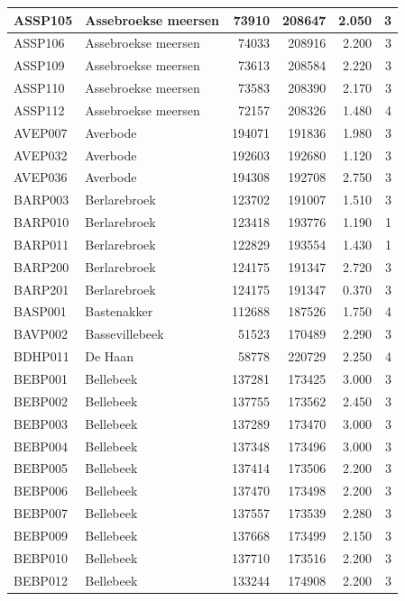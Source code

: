 \documentclass[11pt,]{book}
\begin{document}
\begin{table}
\begin{tabular}[t]{l|l|r|r|r|r}
\hline
ASSP105 & Assebroekse meersen & 73910 & 208647 & 2.050 & 3\\
\hline
ASSP106 & Assebroekse meersen & 74033 & 208916 & 2.200 & 3\\
\hline
ASSP109 & Assebroekse meersen & 73613 & 208584 & 2.220 & 3\\
\hline
ASSP110 & Assebroekse meersen & 73583 & 208390 & 2.170 & 3\\
\hline
ASSP112 & Assebroekse meersen & 72157 & 208326 & 1.480 & 4\\
\hline
AVEP007 & Averbode & 194071 & 191836 & 1.980 & 3\\
\hline
AVEP032 & Averbode & 192603 & 192680 & 1.120 & 3\\
\hline
AVEP036 & Averbode & 194308 & 192708 & 2.750 & 3\\
\hline
BARP003 & Berlarebroek & 123702 & 191007 & 1.510 & 3\\
\hline
BARP010 & Berlarebroek & 123418 & 193776 & 1.190 & 1\\
\hline
BARP011 & Berlarebroek & 122829 & 193554 & 1.430 & 1\\
\hline
BARP200 & Berlarebroek & 124175 & 191347 & 2.720 & 3\\
\hline
BARP201 & Berlarebroek & 124175 & 191347 & 0.370 & 3\\
\hline
BASP001 & Bastenakker & 112688 & 187526 & 1.750 & 4\\
\hline
BAVP002 & Bassevillebeek & 51523 & 170489 & 2.290 & 3\\
\hline
BDHP011 & De Haan & 58778 & 220729 & 2.250 & 4\\
\hline
BEBP001 & Bellebeek & 137281 & 173425 & 3.000 & 3\\
\hline
BEBP002 & Bellebeek & 137755 & 173562 & 2.450 & 3\\
\hline
BEBP003 & Bellebeek & 137289 & 173470 & 3.000 & 3\\
\hline
BEBP004 & Bellebeek & 137348 & 173496 & 3.000 & 3\\
\hline
BEBP005 & Bellebeek & 137414 & 173506 & 2.200 & 3\\
\hline
BEBP006 & Bellebeek & 137470 & 173498 & 2.200 & 3\\
\hline
BEBP007 & Bellebeek & 137557 & 173539 & 2.280 & 3\\
\hline
BEBP009 & Bellebeek & 137668 & 173499 & 2.150 & 3\\
\hline
BEBP010 & Bellebeek & 137710 & 173516 & 2.200 & 3\\
\hline
BEBP012 & Bellebeek & 133244 & 174908 & 2.200 & 3\\

\end{tabular}
\end{table}
\end{document}
